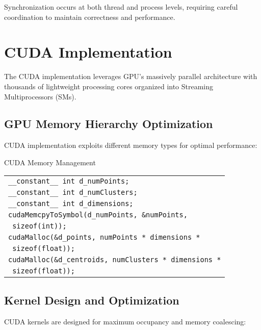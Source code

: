 \documentclass[10pt,a4paper,twocolumn]{article}
\makeatletter
\newcounter{alglineno}
\newenvironment{algtabular}{%
\setcounter{alglineno}{0}%
\begin{tabular}{@{\stepcounter{alglineno}\makebox[1.2em][r]{\tiny\thealglineno:}\hspace{0.2em}}l@{}}%
}{%
\end{tabular}%
}
\makeatother
\begin{document}
Synchronization occurs at both thread and process levels, requiring careful coordination to maintain correctness and performance.

\section{CUDA Implementation}

The CUDA implementation leverages GPU's massively parallel architecture with thousands of lightweight processing cores organized into Streaming Multiprocessors (SMs).

\subsection{GPU Memory Hierarchy Optimization}

CUDA implementation exploits different memory types for optimal performance:

\begin{algorithm}[H]
\caption{CUDA Memory Management}
\label{alg:cuda_memory}
\begin{algtabular}
\texttt{\_\_constant\_\_ int d\_numPoints;} \\
\texttt{\_\_constant\_\_ int d\_numClusters;} \\
\texttt{\_\_constant\_\_ int d\_dimensions;} \\
\texttt{cudaMemcpyToSymbol(d\_numPoints, \&numPoints,} \\
\texttt{                   sizeof(int));} \\
\texttt{cudaMalloc(\&d\_points, numPoints * dimensions *} \\
\texttt{           sizeof(float));} \\
\texttt{cudaMalloc(\&d\_centroids, numClusters * dimensions *} \\
\texttt{           sizeof(float));} \\
\end{algtabular}
\end{algorithm}

\subsection{Kernel Design and Optimization}

CUDA kernels are designed for maximum occupancy and memory coalescing:
\end{document}
